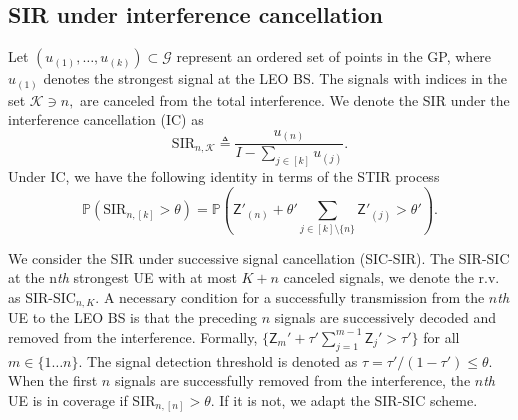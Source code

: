 \documentclass[lettersize,journal]{IEEEtran}
\begin{document}
\subsection{SIR under interference cancellation
}
Let $(u_{(1)}, \dots, u_{(k)}) \subset \mathcal{G}$ represent an ordered set of points in the GP, where $u_{(1)}$ denotes the strongest signal at the LEO BS. The signals with indices in the set $ \mathcal{K} \ni n,$  are canceled from the total interference. We denote the SIR under the interference cancellation (IC) as
\begin{equation}
  \label{eq:IC-SINR}
  \text{SIR}_{n,\mathcal{K}} \triangleq \frac{u_{(n)}}{I-\sum_{j \in [k]} u_{(j)}}.
\end{equation}
Under IC, we have the following identity in terms of the STIR process
\begin{equation}
   \mathbb{P}(\text{SIR}_{n,[k]} > \theta) = \mathbb{P}\left(\mathsf{Z}'_{(n)}+\theta'\sum_{j\in [k] \setminus \{n\}}\mathsf{Z}'_{(j)} > \theta'\right).
\end{equation}




We consider the SIR under successive signal cancellation (SIC-SIR). The SIR-SIC at the n\textit{th} strongest UE with at most $K+n$ canceled signals, we denote the r.v. as SIR-SIC$_{n,K}$. A necessary condition for a successfully transmission from the $n$\textit{th} UE to the LEO BS is that the preceding $n$ signals are successively decoded and removed from the interference. Formally, $\{\mathsf{Z}_m'+\tau'\sum_{j=1}^{m-1}\mathsf{Z}_j'>\tau'\}$ for all $m \in \{1 \dots n\}$. The signal detection threshold is denoted as $ \tau = \tau'/(1-\tau') \leq \theta$. When the first $n$ signals are successfully removed from the interference, the $n$\textit{th} UE is in coverage if SIR$_{n,[n]}>\theta$. If it is not, we adapt the SIR-SIC scheme. %
\end{document}
